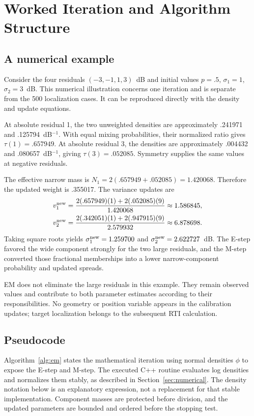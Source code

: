 \documentclass[conference,letterpaper]{IEEEtran}
\begin{document}
\section{Worked Iteration and Algorithm Structure}
\subsection{A numerical example}
Consider the four residuals $(-3,-1,1,3)$~dB and initial values $p=.5$, $\sigma_1=1$, $\sigma_2=3$~dB. This numerical illustration concerns one iteration and is separate from the 500 localization cases. It can be reproduced directly with the density and update equations.

At absolute residual 1, the two unweighted densities are approximately .241971 and .125794~dB$^{-1}$. With equal mixing probabilities, their normalized ratio gives $\tau(1)=.657949$. At absolute residual 3, the densities are approximately .004432 and .080657~dB$^{-1}$, giving $\tau(3)=.052085$. Symmetry supplies the same values at negative residuals.

The effective narrow mass is $N_1=2(.657949+.052085)=1.420068$. Therefore the updated weight is .355017. The variance updates are
\begin{align}
v_1^{\rm new}&=\frac{2(.657949)(1)+2(.052085)(9)}{1.420068}
\approx1.586845,\\
v_2^{\rm new}&=\frac{2(.342051)(1)+2(.947915)(9)}{2.579932}
\approx6.878698.
\end{align}
Taking square roots yields $\sigma_1^{\rm new}=1.259700$ and $\sigma_2^{\rm new}=2.622727$~dB. The E-step favored the wide component strongly for the two large residuals, and the M-step converted those fractional memberships into a lower narrow-component probability and updated spreads.

EM does not eliminate the large residuals in this example. They remain observed values and contribute to both parameter estimates according to their responsibilities. No geometry or position variable appears in the calibration updates; target localization belongs to the subsequent RTI calculation.

\subsection{Pseudocode}
Algorithm~\ref{alg:em} states the mathematical iteration using normal densities $\phi$ to expose the E-step and M-step. The executed C++ routine evaluates log densities and normalizes them stably, as described in Section~\ref{sec:numerical}. The density notation below is an explanatory expression, not a replacement for that stable implementation. Component masses are protected before division, and the updated parameters are bounded and ordered before the stopping test.
\end{document}
